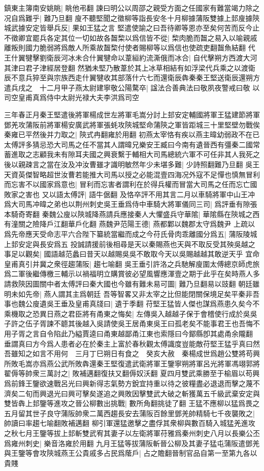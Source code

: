 鎮東主簿南安姚眺|{
	眺他弔翻}
諫曰明公以周邵之親受方面之任國家有難當竭力除之况自爲難乎|{
	難乃旦翻}
廋不聽堅聞之徵柳等詣長安冬十月柳據蒲阪雙據上邽廋據陝城武據安定皆舉兵反|{
	果如王猛之言}
堅遣使諭之曰吾待卿等恩亦至矣何苦而反今止不徵卿宜罷兵各定其位一切如故各齧棃以爲信皆不從|{
	棃肉脆而齧之易入以喻親戚離叛則國力脆弱將爲敵人所乘故齧棃付使者賜柳等以爲信也使疏吏翻齧魚結翻}
代王什翼犍擊劉衛辰河冰未合什翼犍命以葦絙約流澌俄而冰合|{
	自代擊朔方西渡大河其津曰君子津經居登翻}
然猶未堅乃散葦於其上冰草相結有如浮梁代兵乘之以渡衛辰不意兵猝至與宗族西走什翼犍收其部落什六七而還衛辰犇秦秦王堅送衛辰還朔方遣兵戌之　十二月甲子燕太尉建寧敬公陽騖卒|{
	諡法合善典法曰敬夙夜警戒曰敬}
以司空皇甫真爲侍中太尉光禄大夫李洪爲司空

三年春正月秦王堅遣後將軍楊成世左將軍毛嵩分討上邽安定輔國將軍王猛建節將軍鄧羌攻蒲阪前將軍楊安廣武將軍張蚝攻陝城堅命蒲陝之軍皆距城三十里堅壁勿戰俟秦雍已平然後并力取之|{
	陝式冉翻雍於用翻}
初燕太宰恪有疾以燕主暐幼弱政不在已太傅評多猜忌恐大司馬之任不當其人謂暐兄樂安王臧曰今南有遺晉西有彊秦二國常蓄進取之志顧我未有隙耳夫國之興衰繫于輔相大司馬總統六軍不可任非其人我死之後以親疎言之當在汝及冲汝曹雖才識明敏然年少未堪多難|{
	少詩照翻難乃旦翻}
吳王天資英傑智略超世汝曹若能推大司馬以授之必能混壹四海况外寇不足憚也慎無冒利而忘害不以國家爲意也|{
	冒利而忘害者謂利在於得兵權而冒當大司馬之任而忘亡國敗家之害也}
又以語太傅評|{
	語牛倨翻}
及恪卒評不用其言二月以車騎將軍中山王冲爲大司馬冲暐之弟也以荆州刺史吳王垂爲侍中車騎大將軍儀同三司|{
	爲評垂有隙張本騎奇寄翻}
秦魏公廋以陝城降燕請兵應接秦人大懼盛兵守華隂|{
	華隂縣在陝城之西有潼關之險降戶江翻華戶化翻}
燕魏尹范陽王德|{
	燕都鄴以魏郡太守爲魏尹}
上疏以爲先帝應天受命志平六合陛下纂統當繼而成之今苻氏骨肉乖離國分爲五|{
	蒲阪陵城上邽安定與長安爲五}
投誠請援前後相尋是天以秦賜燕也天與不取反受其殃吳越之事足以觀矣|{
	國語越范蠡曰昔天以越賜吳吳不敢取今天以吳賜越越其敢逆天乎}
宜命皇甫真引并冀之衆徑趨蒲阪|{
	趨七喻翻}
吳王垂引許洛之兵馳解廋圍太傅總京師虎旅爲二軍後繼傳檄三輔示以禍福明立購賞彼必望風響應渾壹之期于此乎在矣時燕人多請救陝因圖關中者太傅評曰秦大國也今雖有難未易可圖|{
	難乃旦翻易以豉翻}
朝廷雖明未如先帝|{
	燕人謂其主爲朝廷}
吾等智畧又非太宰之比但能閉關保境足矣平秦非吾事也魏公廋遺吳王垂及皇甫真牋曰|{
	遺于季翻}
苻堅王猛皆人傑也謀爲燕患久矣今不乘機取之恐異日燕之君臣將有甬東之悔矣|{
	左傳吳入越越子保于會稽使行成於吳吳子許之伍子胥諫不聼其後越入吳請使吳王居甬東吳王曰孤老矣不能事君王也吾悔不用子胥之言自令陷此乃縊賈逵曰甬東越鄙甬江東也索隱曰今鄮縣卽其處甬余隴翻}
垂謂真曰方今爲人患者必在於秦主上富於春秋觀太傅識度豈能敵苻堅王猛乎真曰然吾雖知之如言不用何　三月丁巳朔日有食之　癸亥大赦　秦楊成世爲趙公雙將苟興所敗毛嵩亦爲燕公武所敗犇還秦王堅復遣武衛將軍王鑒寧朔將軍呂光將軍馮翊郭將翟傉等帥衆三萬討之|{
	敗補邁翻復扶又翻傉奴沃翻}
夏四月雙武乘勝至于榆眉以苟興爲前鋒王鑒欲速戰呂光曰興新得志氣勢方銳宜持重以待之彼糧盡必退退而擊之蔑不濟矣二旬而興退光曰興可擊矣遂追之興敗因擊雙武大破之斬獲萬五千級武棄安定與雙皆犇上邽鑒等進攻之晉公柳數出挑戰|{
	數所角翻挑徒了翻}
王猛不應柳以猛爲畏之五月留其世子良守蒲阪帥衆二萬西趨長安去蒲阪百餘里鄧羌帥精騎七千夜襲敗之|{
	帥讀曰率趨七喻翻敗補邁翻}
柳引軍還猛邀擊之盡俘其衆柳與數百騎入城猛羌進攻之秋七月王鑒等拔上邽斬雙武宥其妻子以左衛將軍苻雅爲秦州刺史八月以長樂公丕爲雍州刺史|{
	樂音洛雍於用翻}
九月王猛等拔蒲阪斬晉公柳及其妻子猛屯蒲阪遣鄧羌與王鑒等會攻陝城燕王公貴戚多占民爲䕃戶|{
	占之贍翻晉制官品自第一至第九各以貴賤}


